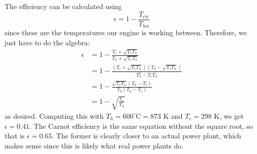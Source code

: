 \documentclass[10pt]{article}
\begin{document}
\begin{enumerate}[label=\alph*)]
			\begin{solution}
				The efficiency can be calculated using 
				\[
					\epsilon = 1 - \frac{T_{cw}}{T_{hw}}
				\] 
				since these are the temperatures our engine is working between. Therefore, we just have to 
				do the algebra:
				\begin{align*}
					\epsilon &= 1 - \frac{T_c + \sqrt{T_c T_h}}{T_h + \sqrt{T_c T_h} }\\
							 &= 1 - \frac{(T_c + \sqrt{ T_c T_h})(T_h - \sqrt{T_cT_h})}{T_h^2 - T_cT_h} \\
							 &= 1 - \frac{\sqrt{T_cT_h}(T_h - T_c)}{T_h(T_h - T_c)}\\
							 &= 1 - \sqrt{\frac{T_c}{T_h}} 
				\end{align*}
				as desired. Computing this with $T_h = 600^\circ\text{C} = 873$ K and $T_c = 298$ K, 
				we get $\epsilon = 0.41$. The Carnot efficiency is the same equation without the square root, 
				so that is $\epsilon = 0.65$. The former is clearly closer to an actual power plant, which makes
				sense since this is likely what real power plants do.
			\end{solution}
	\end{enumerate}
\end{document}
